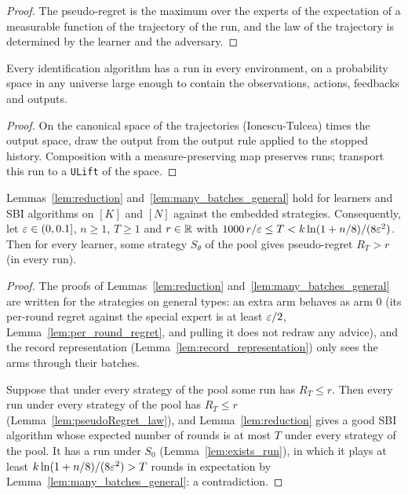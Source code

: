 \begin{proof}
  \leanok
  The pseudo-regret is the maximum over the experts of the expectation of a measurable function of
  the trajectory of the run, and the law of the trajectory is determined by the learner and the
  adversary.
\end{proof}

\begin{lemma}
  \label{lem:exists_run}
  \leanok
  Every identification algorithm has a run in every environment, on a probability space in any
  universe large enough to contain the observations, actions, feedbacks and outputs.
\end{lemma}

\begin{proof}
  \leanok
  On the canonical space of the trajectories (Ionescu-Tulcea) times the output space, draw the
  output from the output rule applied to the stopped history. Composition with a
  measure-preserving map preserves runs; transport this run to a \texttt{ULift} of the space.
\end{proof}

\begin{lemma}
  \label{lem:reduction_ext}
  \leanok
  Lemmas~\ref{lem:reduction} and~\ref{lem:many_batches_general} hold for learners and SBI
  algorithms on $[K]$ and $[N]$ against the embedded strategies. Consequently, let
  $\varepsilon \in (0, 0.1]$, $n \ge 1$, $T \ge 1$ and $r \in \mathbb{R}$ with
  $1000\, r / \varepsilon \le T < k \ln(1 + n/8) / (8 \varepsilon^2)$. Then for every learner, some strategy
  $S_\theta$ of the pool gives pseudo-regret $R_T > r$ (in every run).
\end{lemma}

\begin{proof}
  \leanok
  The proofs of Lemmas~\ref{lem:reduction} and~\ref{lem:many_batches_general} are written for the
  strategies on general types: an extra arm behaves as arm $0$ (its per-round regret against the
  special expert is at least $\varepsilon/2$, Lemma~\ref{lem:per_round_regret}, and pulling it does not
  redraw any advice), and the record representation (Lemma~\ref{lem:record_representation}) only
  sees the arms through their batches.

  Suppose that under every strategy of the pool some run has $R_T \le r$. Then every run under
  every strategy of the pool has $R_T \le r$ (Lemma~\ref{lem:pseudoRegret_law}), and
  Lemma~\ref{lem:reduction} gives a good SBI algorithm whose expected number of rounds is at most
  $T$ under every strategy of the pool. It has a run under $S_0$ (Lemma~\ref{lem:exists_run}), in
  which it plays at least $k \ln(1 + n/8)/(8\varepsilon^2) > T$ rounds in expectation by
  Lemma~\ref{lem:many_batches_general}: a contradiction.
\end{proof}

